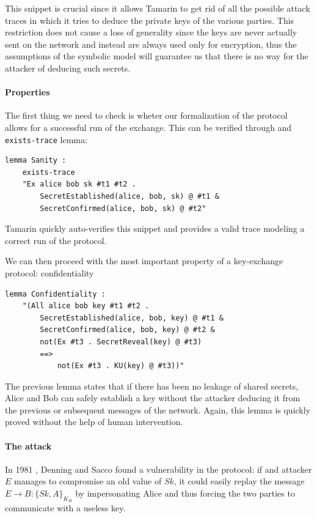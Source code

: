 \documentclass[fleqn,10pt]{SelfArx} %
\begin{document}
This snippet is crucial since it allows Tamarin to get rid of all the possible attack traces in which it tries to deduce the private keys of the various parties. This restriction does not cause a loss of generality since the keys are never actually sent on the network and instead are always used only for encryption, thus the assumptions of the symbolic model will guarantee us that there is no way for the attacker of deducing such secrets.

\paragraph{Properties}

The first thing we need to check is wheter our formalization of the protocol allows for a successful run of the exchange. This can be verified through and \lstinline|exists-trace| lemma:

\begin{lstlisting}[language=Tamarin]
lemma Sanity :
    exists-trace
    "Ex alice bob sk #t1 #t2 .
        SecretEstablished(alice, bob, sk) @ #t1 &
        SecretConfirmed(alice, bob, sk) @ #t2"
\end{lstlisting}

Tamarin quickly auto-verifies this snippet and provides a valid trace modeling a correct run of the protocol.

We can then proceed with the most important property of a key-exchange protocol: confidentiality

\begin{lstlisting}[language=Tamarin]
lemma Confidentiality :
    "(All alice bob key #t1 #t2 .
        SecretEstablished(alice, bob, key) @ #t1 &
        SecretConfirmed(alice, bob, key) @ #t2 &
        not(Ex #t3 . SecretReveal(key) @ #t3)
        ==>
            not(Ex #t3 . KU(key) @ #t3))"
\end{lstlisting}

The previous lemma states that if there has been no leakage of shared secrets, Alice and Bob can safely establish a key without the attacker deducing it from the previous or subsequent messages of the network. Again, this lemma is quickly proved without the help of human intervention.

\paragraph{The attack}

In 1981 \cite{timestampfix}, Denning and Sacco found a vulnerability in the protocol: if and attacker $E$ manages to compromise an old value of $Sk$, it could easily replay the message $E \to B: \{Sk, A\}_{K_B}$ by impersonating Alice and thus forcing the two parties to communicate with a useless key.
\end{document}
